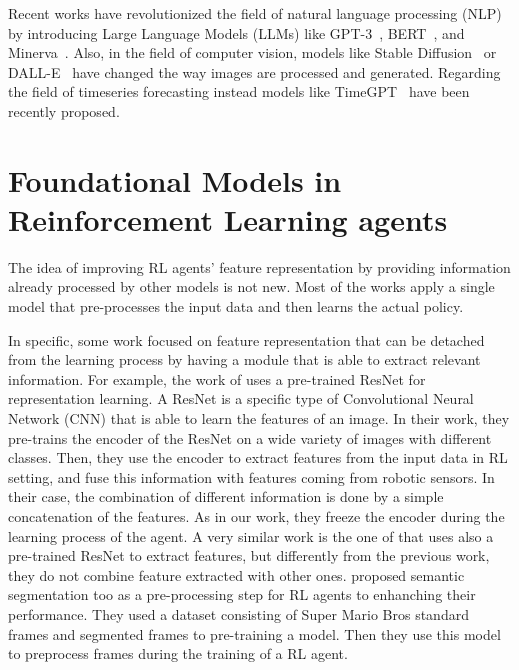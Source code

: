 Recent works have revolutionized the field of natural language processing (NLP) by introducing Large Language Models (LLMs) like GPT-3~\citep{brown2020language}, BERT~\citep{devlin2018bert}, and Minerva~\citep{minerva}.
Also, in the field of computer vision, models like Stable Diffusion~\citep{rombach2022high} or DALL-E~\citep{ramesh2021zero} have changed the way images are processed and generated.
Regarding the field of timeseries forecasting instead models like TimeGPT~\citep{liao2024timegpt} have been recently proposed.



\section{Foundational Models in Reinforcement Learning agents}\label{sec:fm_rl}
The idea of improving RL agents' feature representation by providing information already processed by other models is not new.
Most of the works apply a single model that pre-processes the input data and then learns the actual policy.

In specific, some work focused on feature representation that can be detached from the learning process by having a module that is able to extract relevant information.
For example, the work of \citet{shah2021rrl} uses a pre-trained ResNet \citep{he2016deep} for representation learning.
A ResNet is a specific type of Convolutional Neural Network (CNN) that is able to learn the features of an image.
In their work, they pre-trains the encoder of the ResNet on a wide variety of images with different classes.
Then, they use the encoder to extract features from the input data in RL setting, and fuse this information with features coming from robotic sensors.
In their case, the combination of different information is done by a simple concatenation of the features.
As in our work, they freeze the encoder during the learning process of the agent.
A very similar work is the one of \citet{yuan2022pre} that uses also a pre-trained ResNet to extract features, but differently from the previous work, they do not combine feature extracted with other ones.
\citet{montalvo2023exploiting} proposed semantic segmentation too as a pre-processing step for RL agents to enhanching their performance.
They used a dataset consisting of Super Mario Bros standard frames and segmented frames to pre-training a model.
Then they use this model to preprocess frames during the training of a RL agent.


